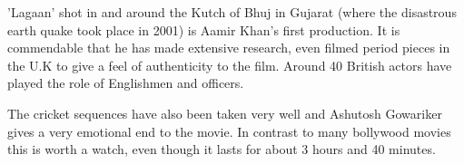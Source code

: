 \documentclass[a4paper]{article}
\begin{document}
'Lagaan' shot in and around the Kutch of Bhuj in Gujarat (where the disastrous earth quake took place in 2001) is Aamir Khan's first production. It is commendable that he has made extensive research, even filmed period pieces in the U.K to give a feel of authenticity to the film. Around 40 British actors have played the role of Englishmen and officers.

The cricket sequences have also been taken very well and Ashutosh Gowariker gives a very emotional end to the movie. In contrast to many bollywood movies this is worth a watch, even though it lasts for about 3 hours and 40 minutes.


	    	        
	        
	            
	        
	        
	        
	    
	    
	

	
	
\end{document}
